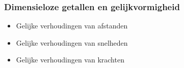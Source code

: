 \documentclass[t]{beamer}
\begin{document}
  	\begin{frame}
		\frametitle{Dimensieloze getallen en gelijkvormigheid}
		\begin{itemize}
			\item<1-3> Gelijke verhoudingen van afstanden
			\item<1-3> Gelijke verhoudingen van snelheden
			\item<2-3> Gelijke verhoudingen van krachten
		\end{itemize}
	\end{frame}
\end{document}

